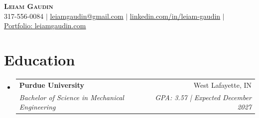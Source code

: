 \documentclass[letterpaper,11pt]{article}
\makeatletter
\newcommand{\resumeSubheading}[4]{
  \vspace{-2pt}\item
    \begin{tabular*}{0.97\textwidth}[t]{l@{\extracolsep{\fill}}r}
      \textbf{#1} & #2 \\
      \textit{\small#3} & \textit{\small #4} \\
    \end{tabular*}\vspace{-7pt}
}
\newcommand{\resumeSubHeadingListStart}{\begin{itemize}[leftmargin=0.15in, label={}]}
\newcommand{\resumeSubHeadingListEnd}{\end{itemize}}
\makeatother
\begin{document}
\pagecolor{paleblue!35}
\begin{center}
    \textbf{\huge \scshape Leiam Gaudin} \\ \vspace{4pt}
    \small 317-556-0084 $|$ \href{mailto:leiamgaudin@gmail.com}{\underline{leiamgaudin@gmail.com}} $|$ 
    \href{https://linkedin.com/in/leiam-gaudin}{\underline{linkedin.com/in/leiam-gaudin}} $|$
    \href{https://leiamgaudin.com/}{\underline{Portfolio: leiamgaudin.com}}
\end{center}

\section{Education}
  \resumeSubHeadingListStart
    \resumeSubheading
      {Purdue University}{West Lafayette, IN}
      {Bachelor of Science in Mechanical Engineering}{GPA: 3.57 | Expected December 2027}
  \resumeSubHeadingListEnd

\end{document}
